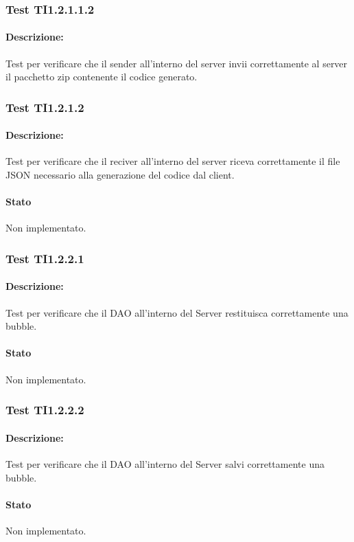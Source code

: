 \documentclass[../PianoDiQualifica.tex]{subfiles}
\begin{document}
	\subsubsection{Test TI1.2.1.1.2}
	\paragraph{Descrizione:} Test per verificare che il sender all'interno del server invii  correttamente al server il pacchetto zip contenente il codice generato.
	\subsubsection{Test TI1.2.1.2}
	\paragraph{Descrizione:} Test per verificare che il reciver all'interno del server riceva correttamente il file JSON necessario alla generazione del codice dal client.
	\paragraph{Stato} Non implementato.
	\subsubsection{Test TI1.2.2.1}
	\paragraph{Descrizione:} Test per verificare che il DAO all'interno del Server restituisca correttamente una bubble.
	\paragraph{Stato} Non implementato.
	
	\subsubsection{Test TI1.2.2.2}
	\paragraph{Descrizione:} Test per verificare che il DAO all'interno del Server salvi correttamente una bubble.
	\paragraph{Stato} Non implementato.
\end{document}
